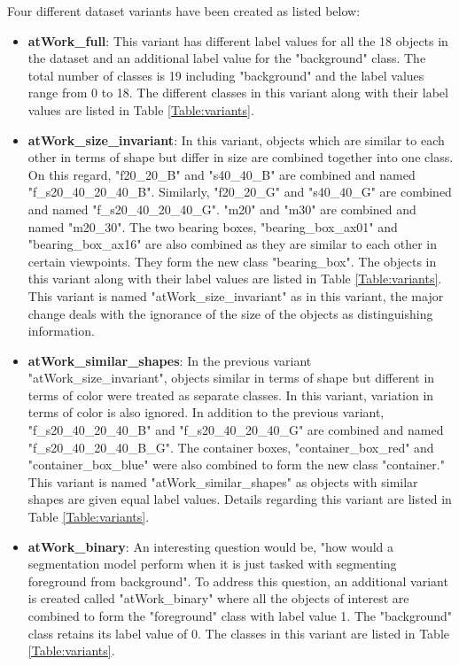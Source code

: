	Four different dataset variants have been created as listed below:
	\begin{itemize}
		\item \textbf{atWork\_full}: This variant has different label values for all the 18 objects in the dataset and an additional label value for the "background" class. The total number of classes is 19 including "background" and the label values range from 0 to 18. The different classes in this variant along with their label values are listed in Table \ref{Table:variants}.
		\item \textbf{atWork\_size\_invariant}: In this variant, objects which are similar to each other in terms of shape but differ in size are combined together into one class. On this regard, "f20\_20\_B" and "s40\_40\_B" are combined and named "f\_s20\_40\_20\_40\_B". Similarly, "f20\_20\_G" and "s40\_40\_G" are combined and named "f\_s20\_40\_20\_40\_G". "m20" and "m30" are combined and named "m20\_30". The two bearing boxes, "bearing\_box\_ax01" and "bearing\_box\_ax16" are also combined as they are similar to each other in certain viewpoints. They form the new class "bearing\_box". The objects in this variant along with their label values are listed in Table \ref{Table:variants}. This variant is named "atWork\_size\_invariant" as in this variant, the major change deals with the ignorance of the size of the objects as distinguishing information.
		\item \textbf{atWork\_similar\_shapes}: In the previous variant "atWork\_size\_invariant", objects similar in terms of shape but different in terms of color were treated as separate classes. In this variant, variation in terms of color is also ignored. In addition to the previous variant, "f\_s20\_40\_20\_40\_B" and "f\_s20\_40\_20\_40\_G" are combined and named "f\_s20\_40\_20\_40\_B\_G". The container boxes, "container\_box\_red" and "container\_box\_blue" were also combined to form the new class "container." This variant is named "atWork\_similar\_shapes" as objects with similar shapes are given equal label values. Details regarding this variant are listed in Table \ref{Table:variants}.
		\item \textbf{atWork\_binary}: An interesting question would be, "how would a segmentation model perform when it is just tasked with segmenting foreground from background". To address this question, an additional variant is created called "atWork\_binary" where all the objects of interest are combined to form the "foreground" class with label value 1. The "background" class retains its label value of 0. The classes in this variant are listed in Table \ref{Table:variants}.
		

\end{itemize}
